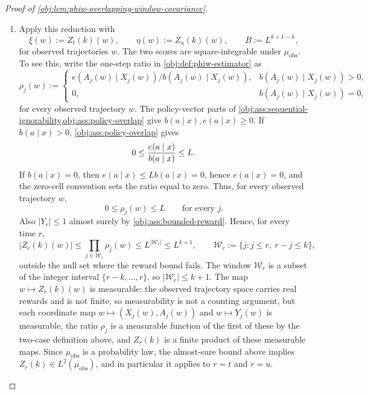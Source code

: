 \documentclass[11pt]{article}
\begin{document}
\begin{proof}[Proof of \cref{obj:lem:phiw-overlapping-window-covariance}]
\begin{enumerate}
\item Apply this reduction with
\[
\xi(w):=Z_t(k)(w),
\qquad
\eta(w):=Z_u(k)(w),
\qquad
B:=L^{k+1-h},
\]
for observed trajectories \(w\). The two scores are square-integrable under \(\mu_{\mathrm{obs}}\). To see this, write the one-step ratio in \cref{obj:def:phiw-estimator} as
\[
\rho_j(w)
:=
\begin{cases}
 e(A_j(w)\mid X_j(w))/b(A_j(w)\mid X_j(w)),& b(A_j(w)\mid X_j(w))>0,\\
 0,& b(A_j(w)\mid X_j(w))=0,
\end{cases}
\]
for every observed trajectory \(w\). The policy-vector parts of \cref{obj:ass:sequential-ignorability,obj:ass:policy-overlap} give \(b(a\mid x),e(a\mid x)\ge 0\). If \(b(a\mid x)>0\), \cref{obj:ass:policy-overlap} gives
\[
0\le {e(a\mid x)\over b(a\mid x)}\le L .
\]
If \(b(a\mid x)=0\), then \(e(a\mid x)\le Lb(a\mid x)=0\), hence \(e(a\mid x)=0\), and the zero-cell convention sets the ratio equal to zero. Thus, for every observed trajectory \(w\),
\[
0\le \rho_j(w)\le L
\qquad\text{for every }j .
\]
Also \(|Y_r|\le 1\) almost surely by \cref{obj:ass:bounded-reward}. Hence, for every time \(r\),
\[
|Z_r(k)(w)|
\le
\prod_{j\in\mathcal W_r}\rho_j(w)
\le
L^{|\mathcal W_r|}
\le
L^{k+1},
\qquad
\mathcal W_r:=\{j: j\le r,\ r-j\le k\},
\]
outside the null set where the reward bound fails. The window \(\mathcal W_r\) is a subset of the integer interval \(\{r-k,\ldots,r\}\), so \(|\mathcal W_r|\le k+1\). The map \(w\mapsto Z_r(k)(w)\) is measurable: the observed trajectory space carries real rewards and is not finite, so measurability is not a counting argument, but each coordinate map \(w\mapsto(X_j(w),A_j(w))\) and \(w\mapsto Y_j(w)\) is measurable, the ratio \(\rho_j\) is a measurable function of the first of these by the two-case definition above, and \(Z_r(k)\) is a finite product of these measurable maps. Since \(\mu_{\mathrm{obs}}\) is a probability law, the almost-sure bound above implies \(Z_r(k)\in L^2(\mu_{\mathrm{obs}})\), and in particular it applies to \(r=t\) and \(r=u\).


\end{enumerate}
\end{proof}
\end{document}
